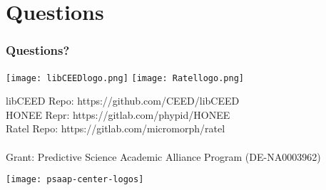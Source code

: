 \documentclass{beamer}
\begin{document}
\section{Questions}

\begin{frame}
\frametitle{Questions?}

\begin{center}
\texttt{[image: libCEEDlogo.png]}
\texttt{[image: Ratellogo.png]}
\end{center}

{\flushleft

libCEED Repo: https://github.com/CEED/libCEED\\
HONEE Repr: https://gitlab.com/phypid/HONEE\\
Ratel Repo: https://gitlab.com/micromorph/ratel\\

~\\

Grant: Predictive Science Academic Alliance Program (DE-NA0003962)\\

}

\begin{center}
\texttt{[image: psaap-center-logos]}
\end{center}

\end{frame}

\end{document}
